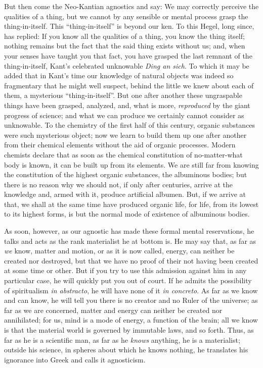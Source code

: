 But then come the Neo-Kantian agnostics and say: We may correctly perceive the
qualities of a thing, but we cannot by any sensible or mental process grasp
the thing-in-itself. This ``thing-in-itself'' is beyond our ken. To this Hegel,
long since, has replied: If you know all the qualities of a thing, you know
the thing itself; nothing remains but the fact that the said thing exists
without us; and, when your senses have taught you that fact, you have grasped
the last remnant of the thing-in-itself, Kant's celebrated unknowable \emph{Ding
an sich}. To which it may be added that in Kant's time our knowledge of natural
objects was indeed so fragmentary that he might well suspect, behind the
little we knew about each of them, a mysterious ``thing-in-itself''. But one
after another these ungraspable things have been grasped, analyzed, and, what
is more, \emph{reproduced} by the giant progress of science; and what we can
produce we certainly cannot consider as unknowable. To the chemistry of the
first half of this century, organic substances were such mysterious object; now
we learn to build them up one after another from their chemical elements without
the aid of organic processes. Modern chemists declare that as soon as the
chemical constitution of no-matter-what body is known, it can be built up from
its elements. We are still far from knowing the constitution of the highest
organic substances, the albuminous bodies; but there is no reason why we should
not, if only after centuries, arrive at the knowledge and, armed with it,
produce artificial albumen. But, if we arrive at that, we shall at the same
time have produced organic life, for life, from its lowest to its highest
forms, is but the normal mode of existence of albuminous bodies.

As soon, however, as our agnostic has made these formal mental reservations, he
talks and acts as the rank materialist he at bottom is. He may say that, as far
as \emph{we} know, matter and motion, or as it is now called, energy, can
neither be created nor destroyed, but that we have no proof of their not having
been created at some time or other. But if you try to use this admission against
him in any particular case, he will quickly put you out of court. If he admits
the possibility of spiritualism \emph{in abstracto}, he will have none of it
\emph{in concreto}. As far as we know and can know, he will tell you there is no
creator and no Ruler of the universe; as far as we are concerned, matter and
energy can neither be created nor annihilated; for us, mind is a mode of energy,
a function of the brain; all we know is that the material world is governed by
immutable laws, and so forth. Thus, as far as he is a scientific man, as far as
he \emph{knows} anything, he is a materialist; outside his science, in spheres
about which he knows nothing, he translates his ignorance into Greek and calls
it agnosticism.

